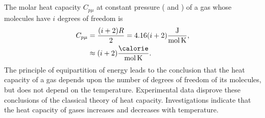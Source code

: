 \subsection{}\label{10.7.2} The molar heat capacity $C_{p\mu}$ at constant pressure ( and ) of a gas whose molecules have $i$ degrees of freedom is
\begin{align*}%
C_{p\mu} & = \frac{(i+2)R}{2} = 4.16 (i+2) \frac{\si{\joule}}{\si{\mole\kelvin}}, \\
& \approx (i+2) \frac{\si{\calorie}}{\si{\mole\kelvin}}.
\end{align*}The principle of equipartition of energy  leads to the conclusion that the heat capacity of a gas depends upon the number of degrees of freedom of its molecules, but does not depend on the temperature. Experimental data disprove these conclusions of the classical theory of heat capacity. Investigations indicate that the heat capacity of gases increases and decreases with temperature.


